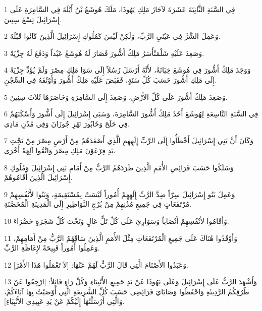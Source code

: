 \par 1 فِي السَّنَةِ الثَّانِيَةَ عَشَرَةَ لآحَازَ مَلِكِ يَهُوذَا، مَلَكَ هُوشَعُ بْنُ أَيْلَةَ فِي السَّامِرَةِ عَلَى إِسْرَائِيلَ تِسْعَ سِنِينَ.
\par 2 وَعَمِلَ الشَّرَّ فِي عَيْنَيِ الرَّبِّ، وَلَكِنْ لَيْسَ كَمُلُوكِ إِسْرَائِيلَ الَّذِينَ كَانُوا قَبْلَهُ.
\par 3 وَصَعِدَ عَلَيْهِ شَلْمَنْأَسَرُ مَلِكُ أَشُّورَ فَصَارَ لَهُ هُوشَعُ عَبْداً وَدَفَعَ لَهُ جِزْيَةً.
\par 4 وَوَجَدَ مَلِكُ أَشُّورَ فِي هُوشَعَ خِيَانَةً، لأَنَّهُ أَرْسَلَ رُسُلاً إِلَى سَوَا مَلِكِ مِصْرَ وَلَمْ يُؤَدِّ جِزْيَةً إِلَى مَلِكِ أَشُّورَ حَسَبَ كُلِّ سَنَةٍ، فَقَبَضَ عَلَيْهِ مَلِكُ أَشُّورَ وَأَوْثَقَهُ فِي السِّجْنِ.
\par 5 وَصَعِدَ مَلِكُ أَشُّورَ عَلَى كُلِّ الأَرْضِ، وَصَعِدَ إِلَى السَّامِرَةِ وَحَاصَرَهَا ثَلاَثَ سِنِينَ.
\par 6 فِي السَّنَةِ التَّاسِعَةِ لِهُوشَعَ أَخَذَ مَلِكُ أَشُّورَ السَّامِرَةَ، وَسَبَى إِسْرَائِيلَ إِلَى أَشُّورَ وَأَسْكَنَهُمْ فِي حَلَحَ وَخَابُورَ نَهْرِ جُوزَانَ وَفِي مُدُنِ مَادِي.
\par 7 وَكَانَ أَنَّ بَنِي إِسْرَائِيلَ أَخْطَأُوا إِلَى الرَّبِّ إِلَهِهِمِ الَّذِي أَصْعَدَهُمْ مِنْ أَرْضِ مِصْرَ مِنْ تَحْتِ يَدِ فِرْعَوْنَ مَلِكِ مِصْرَ وَاتَّقُوا آلِهَةً أُخْرَى،
\par 8 وَسَلَكُوا حَسَبَ فَرَائِضِ الأُمَمِ الَّذِينَ طَرَدَهُمُ الرَّبُّ مِنْ أَمَامِ بَنِي إِسْرَائِيلَ وَمُلُوكِ إِسْرَائِيلَ الَّذِينَ أَقَامُوهُمْ.
\par 9 وَعَمِلَ بَنُو إِسْرَائِيلَ سِرّاً ضِدَّ الرَّبِّ إِلَهِهِمْ أُمُوراً لَيْسَتْ بِمُسْتَقِيمَةٍ، وَبَنُوا لأَنْفُسِهِمْ مُرْتَفَعَاتٍ فِي جَمِيعِ مُدُنِهِمْ مِنْ بُرْجِ النَّوَاطِيرِ إِلَى الْمَدِينَةِ الْمُحَصَّنَةِ.
\par 10 وَأَقَامُوا لأَنْفُسِهِمْ أَنْصَاباً وَسَوَارِيَ عَلَى كُلِّ تَلٍّ عَالٍ وَتَحْتَ كُلِّ شَجَرَةٍ خَضْرَاءَ.
\par 11 وَأَوْقَدُوا هُنَاكَ عَلَى جَمِيعِ الْمُرْتَفَعَاتِ مِثْلَ الأُمَمِ الَّذِينَ سَاقَهُمُ الرَّبُّ مِنْ أَمَامِهِمْ، وَعَمِلُوا أُمُوراً قَبِيحَةً لإِغَاظَةِ الرَّبِّ.
\par 12 وَعَبَدُوا الأَصْنَامَ الَّتِي قَالَ الرَّبُّ لَهُمْ عَنْهَا: [لاَ تَعْمَلُوا هَذَا الأَمْرَ].
\par 13 وَأَشْهَدَ الرَّبُّ عَلَى إِسْرَائِيلَ وَعَلَى يَهُوذَا عَنْ يَدِ جَمِيعِ الأَنْبِيَاءِ وَكُلِّ رَاءٍ قَائِلاً: [ارْجِعُوا عَنْ طُرُقِكُمُ الرَّدِيئَةِ وَاحْفَظُوا وَصَايَايَ فَرَائِضِي حَسَبَ كُلِّ الشَّرِيعَةِ الَّتِي أَوْصَيْتُ بِهَا آبَاءَكُمْ، وَالَّتِي أَرْسَلْتُهَا إِلَيْكُمْ عَنْ يَدِ عَبِيدِي الأَنْبِيَاءِ].
